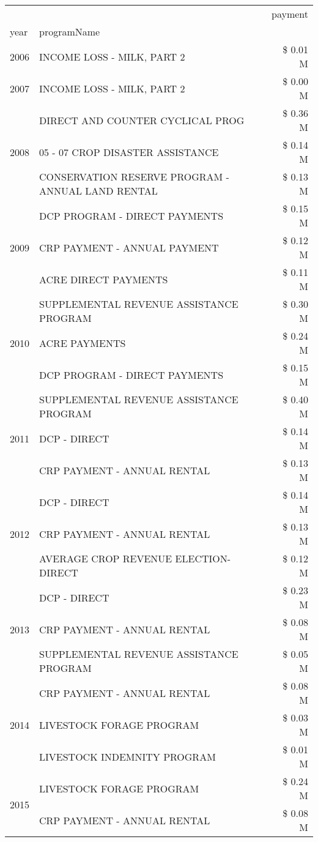 \begin{tabular}{llr}
\toprule
 &  & payment \\
year & programName &  \\
\midrule
2006 & INCOME LOSS - MILK, PART 2 & \$ 0.01 M \\
\cline{1-3}
2007 & INCOME LOSS - MILK, PART 2 & \$ 0.00 M \\
\cline{1-3}
\multirow[t]{3}{*}{2008} & DIRECT AND COUNTER CYCLICAL PROG & \$ 0.36 M \\
 & 05 - 07 CROP DISASTER ASSISTANCE & \$ 0.14 M \\
 & CONSERVATION RESERVE PROGRAM - ANNUAL LAND RENTAL & \$ 0.13 M \\
\cline{1-3}
\multirow[t]{3}{*}{2009} & DCP PROGRAM - DIRECT PAYMENTS & \$ 0.15 M \\
 & CRP PAYMENT - ANNUAL PAYMENT & \$ 0.12 M \\
 & ACRE DIRECT PAYMENTS & \$ 0.11 M \\
\cline{1-3}
\multirow[t]{3}{*}{2010} & SUPPLEMENTAL REVENUE ASSISTANCE PROGRAM & \$ 0.30 M \\
 & ACRE PAYMENTS & \$ 0.24 M \\
 & DCP PROGRAM - DIRECT PAYMENTS & \$ 0.15 M \\
\cline{1-3}
\multirow[t]{3}{*}{2011} & SUPPLEMENTAL REVENUE ASSISTANCE PROGRAM & \$ 0.40 M \\
 & DCP - DIRECT & \$ 0.14 M \\
 & CRP PAYMENT - ANNUAL RENTAL & \$ 0.13 M \\
\cline{1-3}
\multirow[t]{3}{*}{2012} & DCP - DIRECT & \$ 0.14 M \\
 & CRP PAYMENT - ANNUAL RENTAL & \$ 0.13 M \\
 & AVERAGE CROP REVENUE ELECTION-DIRECT & \$ 0.12 M \\
\cline{1-3}
\multirow[t]{3}{*}{2013} & DCP - DIRECT & \$ 0.23 M \\
 & CRP PAYMENT - ANNUAL RENTAL & \$ 0.08 M \\
 & SUPPLEMENTAL REVENUE ASSISTANCE PROGRAM & \$ 0.05 M \\
\cline{1-3}
\multirow[t]{3}{*}{2014} & CRP PAYMENT - ANNUAL RENTAL & \$ 0.08 M \\
 & LIVESTOCK FORAGE PROGRAM & \$ 0.03 M \\
 & LIVESTOCK INDEMNITY PROGRAM & \$ 0.01 M \\
\cline{1-3}
\multirow[t]{3}{*}{2015} & LIVESTOCK FORAGE PROGRAM & \$ 0.24 M \\
 & CRP PAYMENT - ANNUAL RENTAL & \$ 0.08 M \\

\end{tabular}
